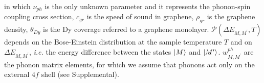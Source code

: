 \documentclass[
reprint,amsmath,amssymb,aps]{revtex4-2}
\begin{document}
in which $\nu_{ph}$ is the only unknown parameter and it represents the phonon-spin coupling cross section, $c_{gr}$ is the speed of sound in graphene, $\rho_{gr}$ is the graphene density, $\theta_{Dy}$ is the Dy coverage referred to a graphene monolayer. $\mathcal{P}\left( \Delta E_{M,M^{\prime}}, T \right)$ depends on the Bose-Einstein distribution at the sample temperature $T$ and on $\Delta E_{M,M^{\prime}}$, \textit{i.e.} the energy difference between the states $\ket{M}$ and $\ket{M^{\prime}}$. $w^{ph}_{M,M^{\prime}}$ are the phonon matrix elements, for which we assume that phonons act only on the external $4f$ shell (see Supplemental).
\end{document}

